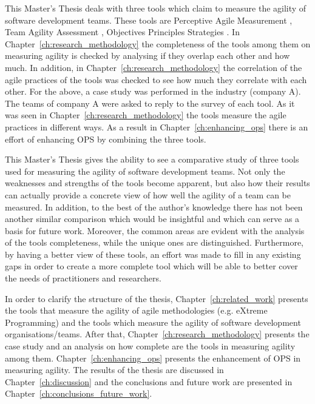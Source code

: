This Master's Thesis deals with three tools which claim to measure the agility of software development teams. These tools are Perceptive Agile Measurement \cite{pam}, Team Agility Assessment \cite{Leffingwell}, Objectives Principles Strategies \cite{sventha_dissertation}. In Chapter~\ref{ch:research_methodology} the completeness of the tools among them on measuring agility is checked by analysing if they overlap each other and how much. In addition, in Chapter~\ref{ch:research_methodology} the correlation of the agile practices of the tools was checked to see how much they correlate with each other. For the above, a case study was performed in the industry (company A). The teams of company A were asked to reply to the survey of each tool. As it was seen in Chapter~\ref{ch:research_methodology} the tools measure the agile practices in different ways. As a result in Chapter~\ref{ch:enhancing_ops} there is an effort of enhancing \ac{OPS} by combining the three tools.

This Master's Thesis gives the ability to see a comparative study of three tools used for measuring the agility of software development teams. Not only the weaknesses and strengths of the tools become apparent, but also how their results can actually provide a concrete view of how well the agility of a team can be measured. In addition, to the best of the author's knowledge there has not been another similar comparison which would be insightful and which can serve as a basis for future work. Moreover, the common areas are evident with the analysis of the tools completeness, while the unique ones are distinguished. Furthermore, by having a better view of these tools, an effort was made to fill in any existing gaps in order to create a more complete tool which will be able to better cover the needs of practitioners and researchers.

In order to clarify the structure of the thesis,  Chapter~\ref{ch:related_work} presents the tools that measure the agility of agile methodologies (e.g. eXtreme Programming) and the tools which measure the agility of software development organisations/teams. After that, Chapter~\ref{ch:research_methodology} presents the case study and an analysis on how complete are the tools in measuring agility among them. Chapter~\ref{ch:enhancing_ops} presents the enhancement of \ac{OPS} in measuring agility. The results of the thesis are discussed in Chapter~\ref{ch:discussion} and the conclusions and future work are presented in Chapter~\ref{ch:conclusions_future_work}.  



